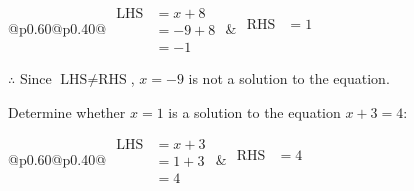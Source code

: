 \documentclass[12pt]{article}
\newcounter{minipagecount}
\begin{document}
\begin{multicols}{2}
\begin{minipage}[t]{0.40\textwidth}
    \noindent
    \renewcommand{\arraystretch}{1.3} %
    \begin{tabular}{@{}p{0.60\linewidth}@{}p{0.40\linewidth}@{}}
        \(\begin{aligned}
            \text{LHS} &= x + 8 \\
                    &= -9 + 8 \\
                    &= -1 
        \end{aligned}\) &
        \(\begin{aligned}
            \text{RHS} &= 1\\
                    & \\
                    &
        \end{aligned}\)
    \end{tabular}
    \renewcommand{\arraystretch}{1.0} %
    \vspace{2pt}  %

    \noindent \(\therefore\) Since \(\text{LHS} \neq \text{RHS}\), \(x = -9\) is not  a solution to the equation.

\end{minipage}

 \vspace*{16pt}
\noindent{(\theminipagecount)}\hspace{0.1mm} %
\begin{minipage}[t]{0.40\textwidth} %

    \noindent Determine whether \(x = 1\) is a solution to the equation \(x + 3 = 4\):
    \vspace{4pt}  %

    \noindent
    \renewcommand{\arraystretch}{1.3} %
    \begin{tabular}{@{}p{0.60\linewidth}@{}p{0.40\linewidth}@{}}
        \(\begin{aligned}
            \text{LHS} &= x + 3 \\
                    &= 1 + 3 \\
                    &= 4 
        \end{aligned}\) &
        \(\begin{aligned}
            \text{RHS} &= 4\\
                    & \\
                    &
        \end{aligned}\)
    \end{tabular}
    \renewcommand{\arraystretch}{1.0} %
    \vspace{2pt}  %


\end{minipage}
\end{multicols}
\end{document}

